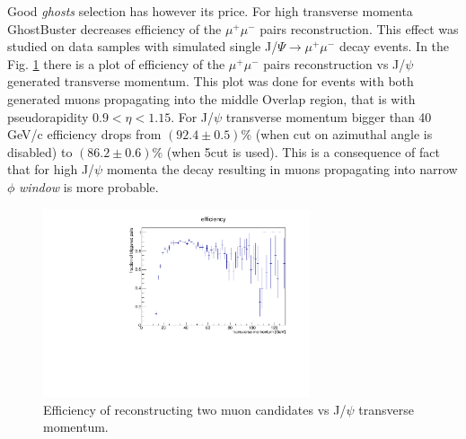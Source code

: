 Good \textit{ghosts} selection has however its price. For high transverse momenta GhostBuster decreases efficiency of the $\mu^{+}\mu^{-}$ pairs reconstruction. This effect was studied on data samples with simulated single J/$\Psi \rightarrow \mu^{+}\mu^{-}$ decay events. In the Fig. \ref{divmom} there is a plot of efficiency of the $\mu^{+}\mu^{-}$ pairs reconstruction vs J/$\psi$ generated transverse momentum. This plot was done for events with both generated muons propagating into the middle Overlap region, that is with pseudorapidity $0.9 < \eta < 1.15$. For J/$\psi$ transverse momentum bigger than 40 GeV/c efficiency drops from $(92.4\pm0.5)\%$ (when cut on azimuthal angle is disabled) to $(86.2\pm0.6)\%$ (when 5\textdegree cut is used). This is a consequence of fact that for high J/$\psi$ momenta the decay resulting in muons propagating into narrow $\phi$ \textit{window} is more probable.
\begin{figure}[ht]
\centering
\includegraphics[width=0.7\textwidth]{efficiency_GB_5.pdf}
\caption{Efficiency of reconstructing two muon candidates vs J/$\psi$ transverse momentum.}
\label{divmom}
\end{figure} 
